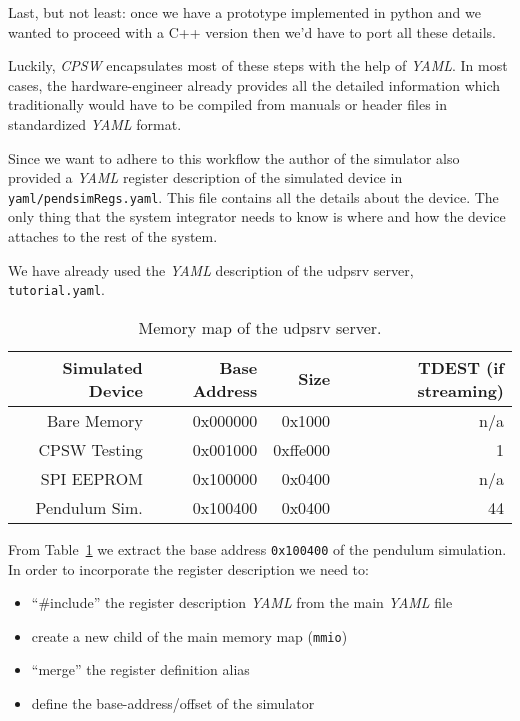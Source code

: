 \documentclass[10pt]{article}
\newcommand{\ita}[1]{\emph{#1}}
\newcommand{\cpsw}      {\ita {CPSW}}
\newcommand{\yaml}      {\ita {YAML}}
\newcommand{\py}        {python}
\newcommand{\udps}      {udpsrv}
\newcommand{\cpp}       {C++}
\newcommand{\cod}[1] {{\tt#1}}
\newcommand{\tutyaml} {\cod{tutorial.yaml}}
\newcounter{tbls}
\begin{document}
Last, but not least: once we have a prototype implemented in \py{} and we wanted
to proceed with a \cpp{} version then we'd have to port all these details.

Luckily, \cpsw{} encapsulates most of these steps with the help of \yaml{}. In most
cases, the hardware-engineer already provides all the detailed information which
traditionally would have to be compiled from manuals or header files in standardized
\yaml{} format.

Since we want to adhere to this workflow the author of the simulator also provided
a \yaml{} register description of the simulated device in \cod{yaml/pendsimRegs.yaml}.
This file contains all the details about the device. The only thing that the system
integrator needs to know is where and how the device attaches to the rest of the system.

We have already used the \yaml{} description of the \udps{} server, \tutyaml{}.
\begin{table}[ht]
\label{tbl:udpsmap}
\hspace*{\fill}
\begin{tabular}{rrrr}
    Simulated Device & Base Address & Size & TDEST (if streaming) \\
\hline
    Bare Memory      & 0x000000     & 0x1000   & n/a \\
    CPSW Testing     & 0x001000     & 0xffe000 &   1 \\
    SPI EEPROM       & 0x100000     & 0x0400   & n/a \\
    Pendulum Sim.    & 0x100400     & 0x0400   &  44 \\
\end{tabular}
\hspace*{\fill}
\caption{Memory map of the \udps{} server.}
\end{table}
From Table~\ref{tbl:udpsmap} we extract the base address \cod{0x100400} of the
pendulum simulation. In order to incorporate the register description we need
to:
\begin{itemize}
\item ``\#include'' the register description \yaml{} from the main \yaml{} file
\item create a new child of the main memory map (\cod{mmio})
\item ``merge'' the register definition alias
\item define the base-address/offset of the simulator
\end{itemize}
\end{document}

